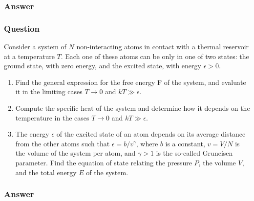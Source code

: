 \subsubsection{Answer}



\subsubsection{Question}
Consider a system of $N$ non-interacting atoms in contact with a thermal reservoir at a temperature $T$. Each one of these atoms can be only in one of two states: the ground state, with zero energy, and the excited state, with energy $\epsilon > 0$.
\begin{enumerate}
	\item Find the general expression for the free energy F of the system, and evaluate it in the limiting cases $T \to 0$ and $kT \gg \epsilon$.
	\item Compute the specific heat of the system and determine how it depends on the temperature in the cases $T \to 0$ and $kT \gg \epsilon$.
	\item The energy $\epsilon$ of the excited state of an atom depends on its average distance from the other atoms such that $\epsilon = b/v^\gamma$, where $b$ is a constant, $v = V/N$ is the volume of the system per atom, and $\gamma > 1$ is the so-called Gruneisen parameter. Find the equation of state relating the pressure $P$, the volume $V$, and the total energy $E$ of the system.
\end{enumerate}
\subsubsection{Answer}



